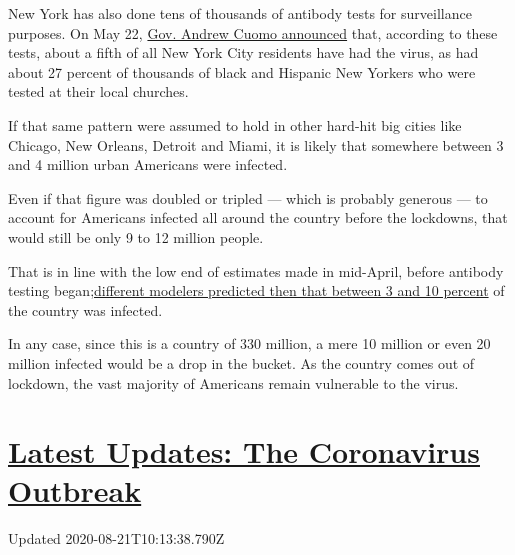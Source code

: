New York has also done tens of thousands of antibody tests for
surveillance purposes. On May 22,
\href{https://www.governor.ny.gov/news/amid-ongoing-covid-19-pandemic-governor-cuomo-announces-results-states-antibody-testing-survey}{Gov.
Andrew Cuomo announced} that, according to these tests, about a fifth of
all New York City residents have had the virus, as had about 27 percent
of thousands of black and Hispanic New Yorkers who were tested at their
local churches.

If that same pattern were assumed to hold in other hard-hit big cities
like Chicago, New Orleans, Detroit and Miami, it is likely that
somewhere between 3 and 4 million urban Americans were infected.

Even if that figure was doubled or tripled --- which is probably
generous --- to account for Americans infected all around the country
before the lockdowns, that would still be only 9 to 12 million people.

That is in line with the low end of estimates made in mid-April, before
antibody testing
began;\href{https://www.nytimes3xbfgragh.onion/2020/04/18/health/coronavirus-america-future.html}{different
modelers predicted then that between 3 and 10 percent} of the country
was infected.

In any case, since this is a country of 330 million, a mere 10 million
or even 20 million infected would be a drop in the bucket. As the
country comes out of lockdown, the vast majority of Americans remain
vulnerable to the virus.

\hypertarget{latest-updates-the-coronavirus-outbreak}{%
\section{\texorpdfstring{\href{https://www.nytimes3xbfgragh.onion/2020/08/21/world/covid-19-coronavirus.html?action=click\&pgtype=Article\&state=default\&region=MAIN_CONTENT_1\&context=storylines_live_updates}{Latest
Updates: The Coronavirus
Outbreak}}{Latest Updates: The Coronavirus Outbreak}}\label{latest-updates-the-coronavirus-outbreak}}

Updated 2020-08-21T10:13:38.790Z

